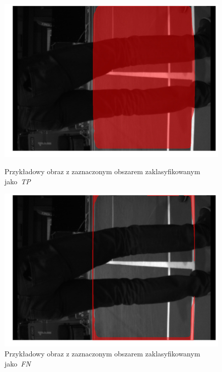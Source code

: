 \begin{figure}[!htb]
    \includegraphics[width=\linewidth]{TP_frame_9.jpg}
    \caption{Przykładowy obraz z zaznaczonym obszarem zaklasyfikowanym jako~\textit{TP}}
    \label{fig:TP}
  \endminipage\hfill
    \includegraphics[width=\linewidth]{FN_frame_9.jpg}
    \caption{Przykładowy obraz z zaznaczonym obszarem zaklasyfikowanym jako~\textit{FN}}
    \label{fig:FN}
  \endminipage\hfill
\end{figure}

